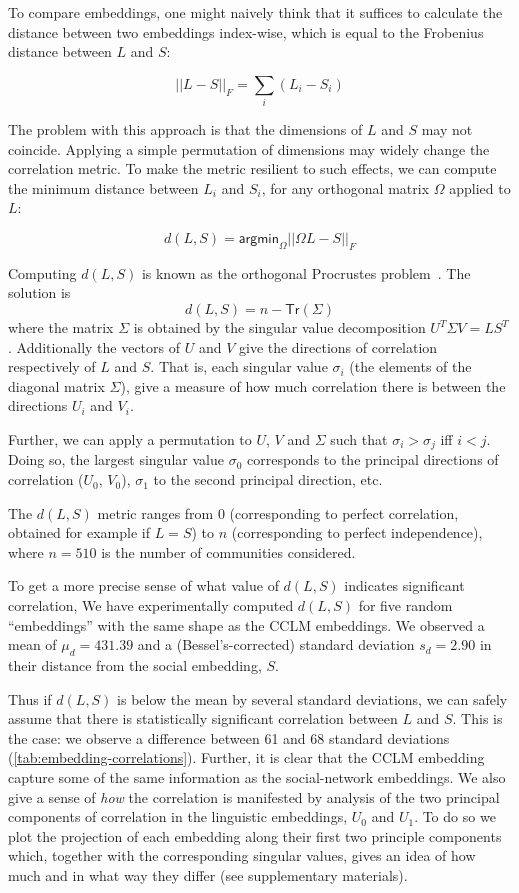 \documentclass[11pt]{article}
\newcommand\jp[1]{\todo[backgroundcolor=blue!10]{JP: #1}}
\begin{document}
To compare embeddings, one might naively think that it suffices to
calculate the distance between two embeddings index-wise, which is
equal to the Frobenius distance between \(L\) and \(S\):

\[||L-S||_F = \sum_i (L_i - S_i)\]

The problem with this approach is that the dimensions of \(L\) and \(S\) may
not coincide. Applying a simple permutation of dimensions may widely
change the correlation metric. To make the metric resilient to such
effects, we can compute the minimum distance between \(L_i\) and \(S_i\), for
any orthogonal matrix \(\Omega\) applied to \(L\):

\[d(L,S) = \mathsf{argmin}_\Omega ||ΩL-S||_F\]

Computing \(d(L,S)\) is known as the orthogonal Procrustes problem~\citep{Gower2004}. The
solution is
\[d(L,S) = n - \mathsf {Tr} (Σ)\] where the matrix \(Σ\) is obtained by the singular value
decomposition \(U^TΣV = LS^T\). Additionally the vectors of \(U\) and \(V\) give
the directions of correlation respectively of \(L\) and \(S\). That is, each
singular value \(\sigma_i\) (the elements of the diagonal matrix \(Σ\)), give a measure of how much
correlation there is between the directions \(U_i\) and \(V_i\).

Further, we can apply a permutation to \(U\), \(V\) and \(Σ\) such
that \(σ_i > σ_j\) iff \(i < j\). Doing so, the largest singular value
\(σ_0\) corresponds to the principal directions of correlation
(\(U_0\), \(V_0\)), \(σ_1\) to the second principal direction, etc.

The \(d(L,S)\) metric ranges from \(0\) 
(corresponding to perfect correlation, 
obtained for example if \(L=S\)) 
to \(n\) 
(corresponding to perfect independence), 
where $n=510$ is the number of communities considered.

To get a more precise sense of what value of \(d(L,S)\) indicates significant correlation,
We have experimentally computed \(d(L,S)\) for five random  ``embeddings'' 
with the same shape as the CCLM embeddings.
We observed a mean of \(μ_d=431.39\) and a (Bessel's-corrected) 
standard deviation \(s_d=2.90\) in their distance from the social embedding, \(S\). %


Thus if \(d(L,S)\) is below the mean by several standard deviations, we can safely
assume that there is statistically significant correlation between
\(L\) and \(S\).  This is the case: we observe a difference between 61 and 68 standard deviations
(\cref{tab:embedding-correlations}). Further, it is clear that the CCLM embedding
capture some of the same information as the social-network embeddings.
We also give a sense of \emph{how} the correlation is manifested by
analysis of the two principal components of correlation in the
linguistic embeddings, \(U_0\) and \(U_1\). To do so we plot the
projection of each embedding along their first two principle components
which, together with the corresponding singular values, gives an idea
of how much and in what way they differ (see supplementary materials).
\end{document}
